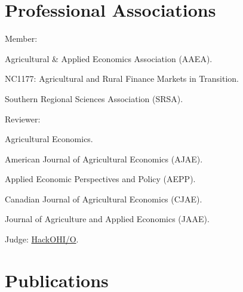 \documentclass[letterpaper]{article}
\renewenvironment{itemize}{
  \begin{list}{}{
    \setlength{\leftmargin}{1.5em}
  }
}{
  \end{list}
}
\begin{document}
\section*{Professional Associations}

\begin{itemize}
\item Member:
  \begin{itemize}
  \item Agricultural \& Applied Economics Association (AAEA).
  \item NC1177: Agricultural and Rural Finance Markets in Transition.
  \item Southern Regional Sciences Association (SRSA).
  \end{itemize}
\item Reviewer:
  \begin{itemize}
  \item Agricultural Economics.
  \item American Journal of Agricultural Economics (AJAE).
  \item Applied Economic Perspectives and Policy (AEPP).
  \item Canadian Journal of Agricultural Economics (CJAE).
  \item Journal of Agriculture and Applied Economics (JAAE).
  \end{itemize}
\item Judge: \href{http://hack.osu.edu/2016/}{HackOHI/O}.
\end{itemize}

\section*{Publications}
\end{document}
